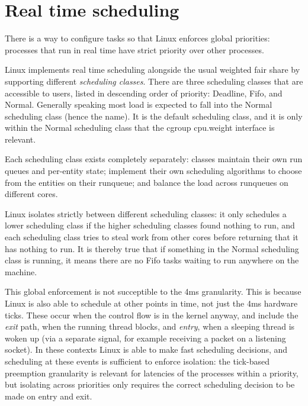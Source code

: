 
\section{Real time scheduling}\label{s:realtime}

There is a way to configure tasks so that Linux enforces global priorities:
processes that run in real time have strict priority over other processes.

Linux implements real time scheduling alongside the usual weighted fair share by
supporting different \textit{scheduling classes}. There are three scheduling
classes that are accessible to users, listed in descending order of priority:
Deadline, Fifo, and Normal. Generally speaking most load is expected to fall
into the Normal scheduling class (hence the name). It is the default scheduling
class, and it is only within the Normal scheduling class that the cgroup
cpu.weight interface is relevant.

Each scheduling class exists completely separately: classes maintain their own
run queues and per-entity state; implement their own scheduling algorithms to
choose from the entities on their runqueue; and balance the load across
runqueues on different cores.

Linux isolates strictly between different scheduling classes: it only schedules
a lower scheduling class if the higher scheduling classes found nothing to run,
and each scheduling class tries to steal work from other cores before returning
that it has nothing to run. It is thereby true that if something in the Normal
scheduling class is running, it means there are no Fifo tasks waiting to run
anywhere on the machine.

This global enforcement is not succeptible to the 4ms granularity. This is
because Linux is also able to schedule at other points in time, not just the 4ms
hardware ticks. These occur when the control flow is in the kernel anyway, and
include the \textit{exit} path, when the running thread blocks, and
\textit{entry}, when a sleeping thread is woken up (via a separate signal, for
example receiving a packet on a listening socket). In these contexts Linux is
able to make fast scheduling decisions, and scheduling at these events is
sufficient to enforce isolation: the tick-based preemption granularity is
relevant for latencies of the processes within a priority, but isolating across
priorities only requires the correct scheduling decision to be made on entry and
exit. 


